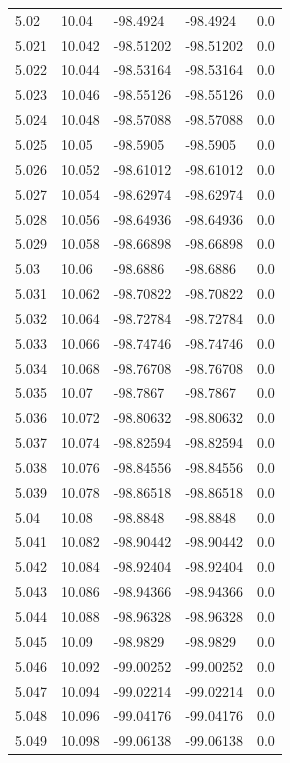 \begin{tabular}{lllll}
5.02 & 10.04 & -98.4924 & -98.4924 & 0.0 \\
5.021 & 10.042 & -98.51202 & -98.51202 & 0.0 \\
5.022 & 10.044 & -98.53164 & -98.53164 & 0.0 \\
5.023 & 10.046 & -98.55126 & -98.55126 & 0.0 \\
5.024 & 10.048 & -98.57088 & -98.57088 & 0.0 \\
5.025 & 10.05 & -98.5905 & -98.5905 & 0.0 \\
5.026 & 10.052 & -98.61012 & -98.61012 & 0.0 \\
5.027 & 10.054 & -98.62974 & -98.62974 & 0.0 \\
5.028 & 10.056 & -98.64936 & -98.64936 & 0.0 \\
5.029 & 10.058 & -98.66898 & -98.66898 & 0.0 \\
5.03 & 10.06 & -98.6886 & -98.6886 & 0.0 \\
5.031 & 10.062 & -98.70822 & -98.70822 & 0.0 \\
5.032 & 10.064 & -98.72784 & -98.72784 & 0.0 \\
5.033 & 10.066 & -98.74746 & -98.74746 & 0.0 \\
5.034 & 10.068 & -98.76708 & -98.76708 & 0.0 \\
5.035 & 10.07 & -98.7867 & -98.7867 & 0.0 \\
5.036 & 10.072 & -98.80632 & -98.80632 & 0.0 \\
5.037 & 10.074 & -98.82594 & -98.82594 & 0.0 \\
5.038 & 10.076 & -98.84556 & -98.84556 & 0.0 \\
5.039 & 10.078 & -98.86518 & -98.86518 & 0.0 \\
5.04 & 10.08 & -98.8848 & -98.8848 & 0.0 \\
5.041 & 10.082 & -98.90442 & -98.90442 & 0.0 \\
5.042 & 10.084 & -98.92404 & -98.92404 & 0.0 \\
5.043 & 10.086 & -98.94366 & -98.94366 & 0.0 \\
5.044 & 10.088 & -98.96328 & -98.96328 & 0.0 \\
5.045 & 10.09 & -98.9829 & -98.9829 & 0.0 \\
5.046 & 10.092 & -99.00252 & -99.00252 & 0.0 \\
5.047 & 10.094 & -99.02214 & -99.02214 & 0.0 \\
5.048 & 10.096 & -99.04176 & -99.04176 & 0.0 \\
5.049 & 10.098 & -99.06138 & -99.06138 & 0.0 \\

\end{tabular}
